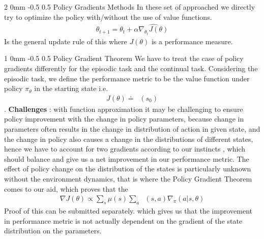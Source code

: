 \documentclass[twocolumn,11pt]{article}
\makeatletter
\DeclareMathOperator{\qp}{q_\pi} %
\DeclareMathOperator{\vpt}{v_{\pi_\theta}}
\renewcommand{\section}{\@startsection
{section}%
{2}%
{0mm}%
{-0.5\baselineskip}%
{0.5\baselineskip}%
{\bfseries\color{blue}}} %
\renewcommand{\subsection}{\@startsection
{subsection}%
{1}%
{0mm}%
{-0.5\baselineskip}%
{0.5\baselineskip}%
{\bfseries\color{blue}}} %
\makeatother
\begin{document}
\section{Policy Gradients Methods}
In these  set  of approached we  directly  try to optimize the policy with/without the use of value functions. 
\begin{align*}
\theta_{t+1} = \theta_t + \alpha\widehat{\nabla_{\theta_t}J(\theta)}
\end{align*}
Is the general update rule of this where $J(\theta)$ is a performance measure.

\subsection{Policy Gradient Theorem}
We have to treat the case of policy gradients differently for the episodic task and the continual task. Considering the episodic task, we define the  performance metric to be the value function under policy $\pi_\theta $ in the starting state i.e.
\begin{align*}
J(\theta) \doteq \vpt(s_0)
\end{align*}.
\textbf{Challenges} : with function approximation  it may be challenging  to ensure policy improvement with  the change in policy parameters, because change in parameters often results in the change in distribution of action in given state, and the change in policy also  causes a change in the distributions of different states,  hence we have  to account for two gradients according to  our instincts , which  should balance and give us a net improvement in our performance metric. The effect of policy change on the distribution of the  states  is particularly unknown without the environment dynamics, that is where the Policy Gradient Theorem  comes to our aid, which proves that the 
\begin{align*}
\nabla J(\theta) \propto \sum_s \mu(s) \sum_a \qp(s, a) \nabla_\pi (a | s, \theta)
\end{align*}
Proof of this can be submitted separately.
which  gives us that the improvement in performance metric is not actually dependent on the gradient of the state  distribution on  the parameters.
\end{document}
